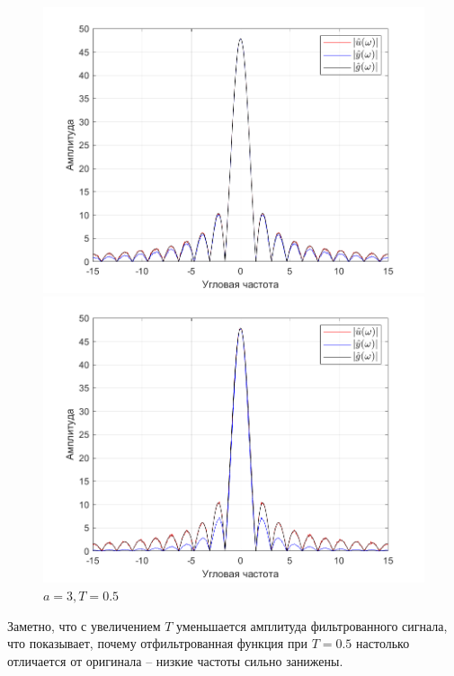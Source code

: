 \documentclass[a4paper]{article}
\begin{document}
\begin{figure}[H]
    \begin{minipage}{0.5\textwidth}
        \centering
        \includegraphics[width=\linewidth]{ex1_1/a=3_T=0.1/h3.png}
        \caption{$a = 3, T = 0.1$}
    \end{minipage}
    \begin{minipage}{0.5\textwidth}
        \centering
        \includegraphics[width=\linewidth]{ex1_1/a=3_T=0.5/h3.png}
        \caption{$a = 3, T = 0.5$}
    \end{minipage}
\end{figure}

Заметно, что с увеличением $T$ уменьшается амплитуда фильтрованного сигнала, что показывает, почему отфильтрованная функция при $T = 0.5$ настолько отличается от оригинала -- низкие частоты сильно занижены.\ 
\end{document}
